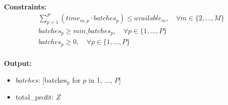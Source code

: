 \documentclass{article}
\begin{document}
\textbf{Constraints:}
\begin{align*}
    & \sum_{p=1}^{P} (time_{m,p} \cdot batches_{p}) \leq available_{m}, \quad \forall m \in \{2, \ldots, M\} \\
    & batches_{p} \geq min\_batches_{p}, \quad \forall p \in \{1, \ldots, P\} \\
    & batches_{p} \geq 0, \quad \forall p \in \{1, \ldots, P\} \\
\end{align*}

\textbf{Output:}
\begin{itemize}
    \item $batches$: [batches$_{p}$ for $p$ in 1, ..., $P$]
    \item total\_profit: $Z$
\end{itemize}
\end{document}
